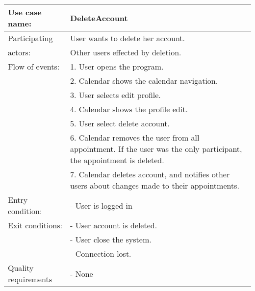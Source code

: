 {\tabulinesep=1.2mm
\begin{tabu}{ | p{3cm} | p{13cm} |}
    \hline
    Use case name: 			& 		DeleteAccount\\ \hline
    Participating  			& 		User wants to delete her account. \\
    actors:					&		Other users effected by deletion.\\ \hline
    Flow of events: 		& 		1. User opens the program. \\
							&		2. Calendar shows the calendar navigation.\\
							&		3. User selects edit profile.\\
							&		4. Calendar shows the profile edit.\\
							&		5. User select delete account.\\
							&		6. Calendar removes the user from all appointment. If the user was the only participant, the appointment is deleted.\\
							&		7. Calendar deletes account, and notifies other users about changes made to their appointments. \\\hline
    Entry condition: 		& 		- User is logged in  \\ \hline
	Exit conditions: 		&		- User account is deleted.\\
							&		- User close the system.\\
							&		- Connection lost.\\\hline
	Quality requirements	&	 	- None \\\hline
\end{tabu}
}